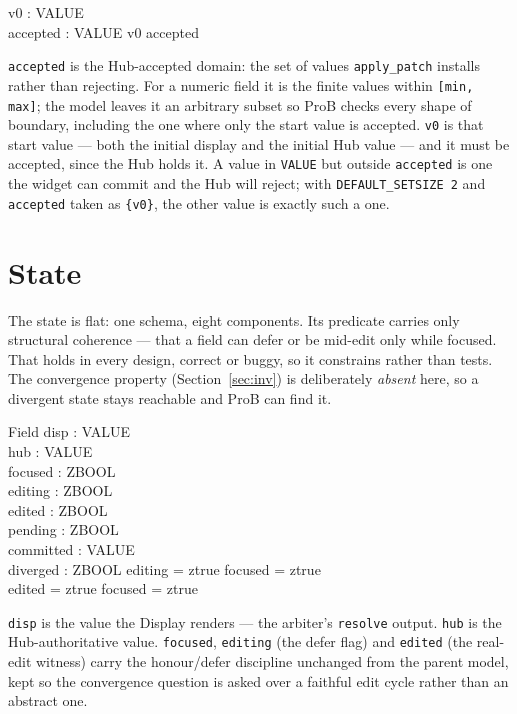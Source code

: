 \documentclass[a4paper,10pt,fleqn]{article}
\begin{document}
\begin{axdef}
  v0 : VALUE \\
  accepted : \power VALUE
\where
  v0 \in accepted
\end{axdef}

\texttt{accepted} is the Hub-accepted domain: the set of values
\texttt{apply\_patch} installs rather than rejecting.  For a numeric field it is
the finite values within \texttt{[min, max]}; the model leaves it an arbitrary
subset so ProB checks every shape of boundary, including the one where only the
start value is accepted.  \texttt{v0} is that start value --- both the initial
display and the initial Hub value --- and it must be accepted, since the Hub holds
it.  A value in \texttt{VALUE} but outside \texttt{accepted} is one the widget can
commit and the Hub will reject; with \texttt{DEFAULT\_SETSIZE 2} and
\texttt{accepted} taken as \texttt{\{v0\}}, the other value is exactly such a one.

\section{State}

The state is flat: one schema, eight components.  Its predicate carries only
structural coherence --- that a field can defer or be mid-edit only while focused.
That holds in every design, correct or buggy, so it constrains rather than tests.
The convergence property (Section~\ref{sec:inv}) is deliberately \emph{absent}
here, so a divergent state stays reachable and ProB can find it.

\begin{schema}{Field}
  disp : VALUE \\
  hub : VALUE \\
  focused : ZBOOL \\
  editing : ZBOOL \\
  edited : ZBOOL \\
  pending : ZBOOL \\
  committed : VALUE \\
  diverged : ZBOOL
\where
  editing = ztrue \implies focused = ztrue \\
  edited = ztrue \implies focused = ztrue
\end{schema}

\texttt{disp} is the value the Display renders --- the arbiter's \texttt{resolve}
output.  \texttt{hub} is the Hub-authoritative value.  \texttt{focused},
\texttt{editing} (the defer flag) and \texttt{edited} (the real-edit witness)
carry the honour/defer discipline unchanged from the parent model, kept so the
convergence question is asked over a faithful edit cycle rather than an abstract
one.
\end{document}
